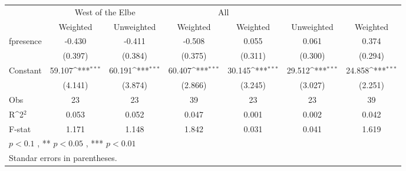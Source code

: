 {
\def\sym#1{\ifmmode^{#1}\else\(^{#1}\)\fi}
\begin{tabular}{@{\extracolsep{2pt}}l*{6}{c}@{}}
\hline\hline
& \multicolumn{2}{c}{West of the Elbe} & \multicolumn{2}{c}{All} \\
\cline{2-3-4}
\cline{5-6}
 & Weighted & Unweighted & Weighted & Weighted & Unweighted & Weighted \\
\hline
fpresence & -0.430 & -0.411 & -0.508 & 0.055 & 0.061 & 0.374 \\
 & (0.397) & (0.384) & (0.375) & (0.311) & (0.300) & (0.294) \\
Constant & 59.107\sym{***} & 60.191\sym{***} & 60.407\sym{***} & 30.145\sym{***} & 29.512\sym{***} & 24.858\sym{***} \\
 & (4.141) & (3.874) & (2.866) & (3.245) & (3.027) & (2.251) \\

\hline
Obs & 23 & 23 & 39 & 23 & 23 & 39 \\
R\sym{2} & 0.053 & 0.052 & 0.047 & 0.001 & 0.002 & 0.042 \\
F-stat & 1.171 & 1.148 & 1.842 & 0.031 & 0.041 & 1.619 \\
\hline\hline
\multicolumn{7}{l}{\footnotesize *$p < 0.1$ , ** $p < 0.05$ , *** $p < 0.01$} \\
\multicolumn{7}{l}{\footnotesize Standar errors in parentheses.} \\
\end{tabular}
}
